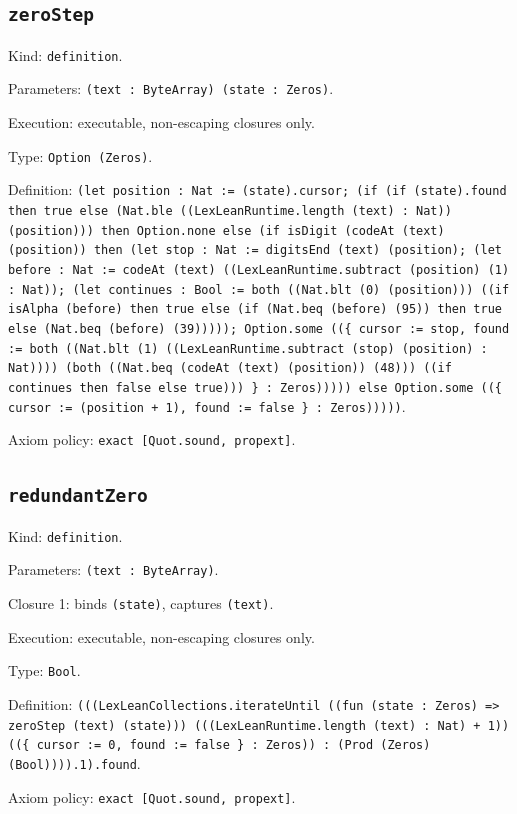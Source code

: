 \documentclass[11pt]{article}
\begin{document}
\subsection*{\texttt{zeroStep}}
\noindent Kind: \texttt{definition}.\par
\noindent Parameters: \texttt{(text : ByteArray) (state : Zeros)}.\par
\noindent Execution: executable, non-escaping closures only.\par
\noindent Type: \texttt{Option (Zeros)}.\par
\noindent Definition: \texttt{(let position : Nat := (state).cursor; (if (if (state).found then true else (Nat.ble ((LexLeanRuntime.length (text) : Nat)) (position))) then Option.none else (if isDigit (codeAt (text) (position)) then (let stop : Nat := digitsEnd (text) (position); (let before : Nat := codeAt (text) ((LexLeanRuntime.subtract (position) (1) : Nat)); (let continues : Bool := both ((Nat.blt (0) (position))) ((if isAlpha (before) then true else (if (Nat.beq (before) (95)) then true else (Nat.beq (before) (39))))); Option.some ((\{ cursor := stop, found := both ((Nat.blt (1) ((LexLeanRuntime.subtract (stop) (position) : Nat)))) (both ((Nat.beq (codeAt (text) (position)) (48))) ((if continues then false else true))) \} : Zeros))))) else Option.some ((\{ cursor := (position + 1), found := false \} : Zeros)))))}.\par
\noindent Axiom policy: \texttt{exact [Quot.sound, propext]}.\par
\subsection*{\texttt{redundantZero}}
\noindent Kind: \texttt{definition}.\par
\noindent Parameters: \texttt{(text : ByteArray)}.\par
\noindent Closure 1: binds \texttt{(state)}, captures \texttt{(text)}.\par
\noindent Execution: executable, non-escaping closures only.\par
\noindent Type: \texttt{Bool}.\par
\noindent Definition: \texttt{(((LexLeanCollections.iterateUntil ((fun (state : Zeros) => zeroStep (text) (state))) (((LexLeanRuntime.length (text) : Nat) + 1)) ((\{ cursor := 0, found := false \} : Zeros)) : (Prod (Zeros) (Bool)))).1).found}.\par
\noindent Axiom policy: \texttt{exact [Quot.sound, propext]}.\par
\end{document}
